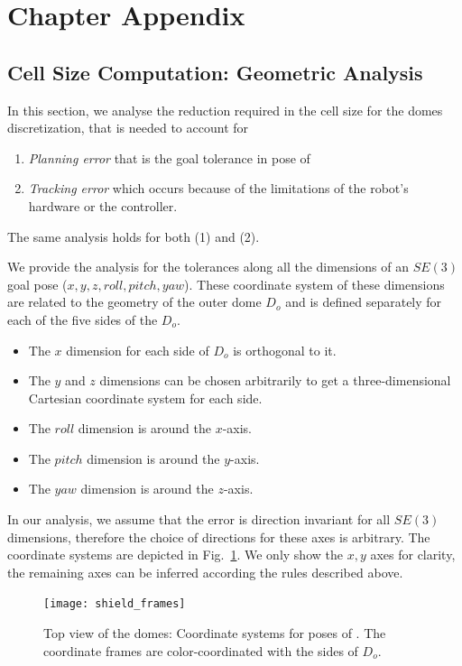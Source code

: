 \documentclass[a4paper]{report}
\begin{document}
\section{Chapter Appendix}
\subsection{Cell Size Computation: Geometric Analysis}
\label{sec:cell_size}
In this section, we analyse the reduction required in the cell size for the domes discretization, that is needed to account for

\begin{enumerate}
	\item \emph{Planning error} that is the goal tolerance in pose of \calS
	\item \emph{Tracking error} which occurs because of the limitations of the robot's hardware or the controller.
\end{enumerate}

The same analysis holds for both (1) and (2).

We provide the analysis for the tolerances along all the dimensions of an $SE(3)$ goal pose ($x,y,z,roll,pitch,yaw$). These coordinate system of these dimensions are related to the geometry of the outer dome $D_o$ and is defined separately for each of the five sides of the $D_o$.

\begin{itemize}
	\item The $x$ dimension for each side of $D_o$ is orthogonal to it.
	\item The $y$ and $z$ dimensions can be chosen arbitrarily to get a three-dimensional Cartesian coordinate system for each side.
	\item The $roll$ dimension is around the $x$-axis.
	\item The $pitch$ dimension is around the $y$-axis.
	\item The $yaw$ dimension is around the $z$-axis.
\end{itemize}

In our analysis, we assume that the error is direction invariant for all $SE(3)$ dimensions, therefore the choice of directions for these axes is arbitrary. The coordinate systems are depicted in Fig.~\ref{fig:shield_frames}. We only show the $x,y$ axes for clarity, the remaining axes can be inferred according the rules described above.

\begin{figure}[ht]
\centering
\texttt{[image: shield\_frames]}
\caption{Top view of the domes: Coordinate systems for poses of \calS. The coordinate frames are color-coordinated with the sides of $D_o$.}
\label{fig:shield_frames}
\end{figure}
\end{document}

